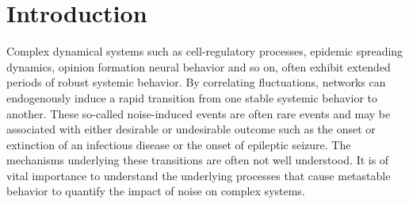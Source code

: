 \documentclass[a4paper, 11pt, twocolumn]{article}
\begin{document}


\section{Introduction}
\label{sec:orgd6a1d62}
Complex dynamical systems such as cell-regulatory processes,
epidemic  spreading   dynamics,  opinion   formation  neural
behavior and so on,  often exhibit extended periods of robust systemic behavior.
By correlating fluctuations, networks can endogenously induce a
rapid transition from one stable systemic
behavior to  another. These so-called noise-induced events  are often
rare events  and may be associated  with either desirable or undesirable outcome
such  as the onset or extinction of  an infectious  disease or the onset of epileptic seizure.
The  mechanisms
underlying these transitions are  often not well understood.
It  is  of vital  importance  to  understand the  underlying
processes  that cause  metastable behavior  to quantify  the
impact of noise on complex systems.
\end{document}

